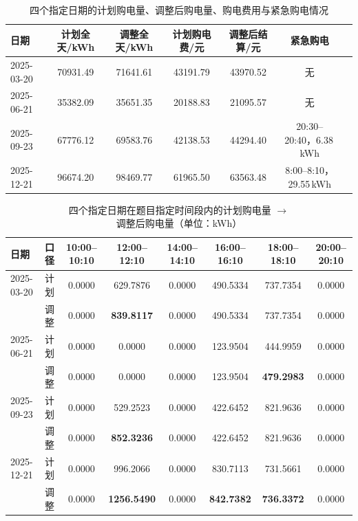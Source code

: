 \begin{table}[!htbp]
\caption{四个指定日期的计划购电量、调整后购电量、购电费用与紧急购电情况}\label{tab:q3-days}
\centering
\small
\setlength{\tabcolsep}{5pt}
\begin{tabular}{lcccccc}
\toprule
日期 & 计划全天/kWh & 调整全天/kWh & 计划购电费/元 & 调整后结算/元 & 紧急购电 \\
\midrule
2025-03-20 & 70931.49 & 71641.61 & 43191.79 & 43970.52 & 无 \\
2025-06-21 & 35382.09 & 35651.35 & 20188.83 & 21095.57 & 无 \\
2025-09-23 & 67776.12 & 69583.76 & 42138.53 & 44294.40 & 20:30--20:40，6.38\,kWh \\
2025-12-21 & 96674.20 & 98469.77 & 61965.50 & 63563.48 & 8:00--8:10，29.55\,kWh \\
\bottomrule
\end{tabular}
\end{table}

\begin{table}[!htbp]
\caption{四个指定日期在题目指定时间段内的计划购电量 $\rightarrow$ 调整后购电量（单位：kWh）}\label{tab:q3-six}
\centering
\small
\setlength{\tabcolsep}{4pt}
\begin{tabular}{llcccccc}
\toprule
日期 & 口径 & 10:00--10:10 & 12:00--12:10 & 14:00--14:10 & 16:00--16:10 & 18:00--18:10 & 20:00--20:10 \\
\midrule
2025-03-20 & 计划 & 0.0000 & 629.7876 & 0.0000 & 490.5334 & 737.7354 & 0.0000 \\
           & 调整 & 0.0000 & \textbf{839.8117} & 0.0000 & 490.5334 & 737.7354 & 0.0000 \\
2025-06-21 & 计划 & 0.0000 & 0.0000 & 0.0000 & 123.9504 & 444.9959 & 0.0000 \\
           & 调整 & 0.0000 & 0.0000 & 0.0000 & 123.9504 & \textbf{479.2983} & 0.0000 \\
2025-09-23 & 计划 & 0.0000 & 529.2523 & 0.0000 & 422.6452 & 821.9636 & 0.0000 \\
           & 调整 & 0.0000 & \textbf{852.3236} & 0.0000 & 422.6452 & 821.9636 & 0.0000 \\
2025-12-21 & 计划 & 0.0000 & 996.2066 & 0.0000 & 830.7113 & 731.5661 & 0.0000 \\
           & 调整 & 0.0000 & \textbf{1256.5490} & 0.0000 & \textbf{842.7382} & \textbf{736.3372} & 0.0000 \\
\bottomrule
\end{tabular}
\end{table}

